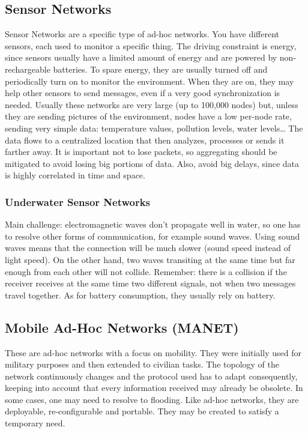\subsection{Sensor Networks}
Sensor Networks are a specific type of ad-hoc networks. You have 
different sensors, each used to monitor a specific thing. The driving constraint 
is energy, since sensors usually have a limited amount of energy and are powered 
by non-rechargeable batteries. To spare energy, they are usually turned off and 
periodically turn on to monitor the environment. 	When they are on, they 
may help other sensors to send messages, even if a very good synchronization is
needed. 
Usually these networks are very large (up to 100,000 nodes) but, unless 
they are sending pictures of the environment, nodes have a low per-node rate, 
sending very simple data: temperature values, pollution levels, water 
levels\dots
The data flows to a centralized location that then analyzes, processes 
or sends it farther away.
It is important not to lose packets, so aggregating should be mitigated 
to avoid losing big portions of data. Also, avoid big delays, since data is 
highly correlated in time and space.

\subsubsection{Underwater Sensor Networks}
Main challenge: electromagnetic waves don't propagate well in water, so 
one has to resolve other forms of communication, for example sound waves.
Using sound waves means that the connection will be much slower (sound 
speed instead of light speed). On the other hand, two waves transiting at the
same time but far enough from each other will not collide. Remember: there is a 
collision if the receiver receives at the same time two different signals, not 
when two messages travel together.
As for battery consumption, they usually rely on battery.

\subsection{Mobile Ad-Hoc Networks (MANET)}
These are ad-hoc networks with a focus on mobility. They were initially 
used for military purposes and then extended to civilian tasks. The topology of 
the network continuously changes and the protocol used has to adapt 
consequently, keeping into account that every information received may already 
be obsolete. In some cases, one may need to resolve to flooding. Like ad-hoc 
networks, they are deployable, re-configurable and portable. They may be created 
to satisfy a temporary need.

